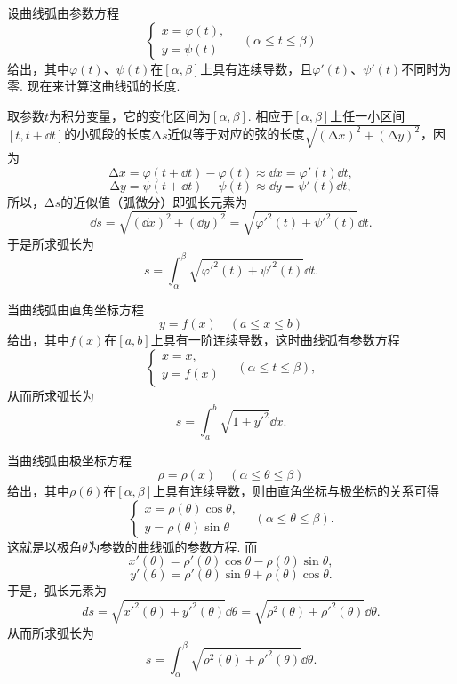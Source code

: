 设曲线弧由参数方程\[
\left\{ \begin{array}{l}
x = \varphi(t), \\
y = \psi(t)
\end{array} \right.
\quad(\alpha \leqslant t \leqslant \beta)
\]给出，其中\(\varphi(t)\)、\(\psi(t)\)在\([\alpha,\beta]\)上具有连续导数，且\(\varphi'(t)\)、\(\psi'(t)\)不同时为零.
现在来计算这曲线弧的长度.

取参数\(t\)为积分变量，它的变化区间为\([\alpha,\beta]\).
相应于\([\alpha,\beta]\)上任一小区间\([t,t+\dd{t}]\)的小弧段的长度\(\increment s\)近似等于对应的弦的长度\(\sqrt{(\increment x)^2+(\increment y)^2}\)，因为\[
\increment x = \varphi(t+\dd{t})-\varphi(t) \approx \dd{x} = \varphi'(t) \dd{t},
\]\[
\increment y = \psi(t+\dd{t})-\psi(t) \approx \dd{y} = \psi'(t) \dd{t},
\]所以，\(\increment s\)的近似值（弧微分）即弧长元素为\[
\dd{s} = \sqrt{(\dd{x})^2 + (\dd{y})^2}
= \sqrt{\varphi'^2(t) + \psi'^2(t)} \dd{t}.
\]于是所求弧长为\begin{equation}
s = \int_{\alpha}^{\beta} \sqrt{\varphi'^2(t) + \psi'^2(t)} \dd{t}.
\end{equation}

当曲线弧由直角坐标方程\[
y = f(x) \quad(a \leqslant x \leqslant b)
\]给出，其中\(f(x)\)在\([a,b]\)上具有一阶连续导数，这时曲线弧有参数方程\[
\left\{ \begin{array}{l}
x = x, \\
y = f(x)
\end{array} \right.
\quad(\alpha \leqslant t \leqslant \beta),
\]从而所求弧长为\begin{equation}
s = \int_a^b \sqrt{1+y'^2} \dd{x}.
\end{equation}

当曲线弧由极坐标方程\[
\rho=\rho(x)
\quad(\alpha \leqslant \theta \leqslant \beta)
\]给出，其中\(\rho(\theta)\)在\([\alpha,\beta]\)上具有连续导数，则由直角坐标与极坐标的关系可得\[
\left\{ \begin{array}{c}
x = \rho(\theta) \cos\theta, \\
y = \rho(\theta) \sin\theta
\end{array} \right.
\quad(\alpha \leqslant \theta \leqslant \beta).
\]
这就是以极角\(\theta\)为参数的曲线弧的参数方程.
而\[
x'(\theta) = \rho'(\theta) \cos\theta - \rho(\theta) \sin\theta,
\]\[
y'(\theta) = \rho'(\theta) \sin\theta + \rho(\theta) \cos\theta.
\]
于是，弧长元素为\[
ds = \sqrt{x'^2(\theta) + y'^2(\theta)} \dd{\theta}
= \sqrt{\rho^2(\theta) + \rho'^2(\theta)} \dd{\theta}.
\]从而所求弧长为\begin{equation}
s = \int_{\alpha}^{\beta} \sqrt{\rho^2(\theta) + \rho'^2(\theta)} \dd{\theta}.
\end{equation}

